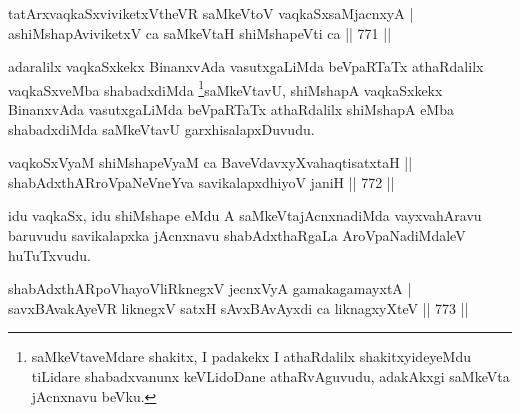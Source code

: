 
\begin{shl}
tatArxvaqkaSxviviketxV\s theVR saMkeVtoV vaqkaSxsaMjacnxyA | \\
ashiMshapAviviketxV ca saMkeVtaH shiMshapeVti ca \hfill||  771 ||  
\end{shl}

\begin{artha}
adaralilx vaqkaSxkekx BinanxvAda vasutxgaLiMda beVpaRTaTx athaRdalilx vaqkaSxveMba shabadxdiMda \footnote{saMkeVtaveMdare shakitx, I padakekx I athaRdalilx shakitxyideyeMdu tiLidare shabadxvanunx keVLidoDane athaRvAguvudu, adakAkxgi saMkeVta jAcnxnavu beVku.}saMkeVtavU, shiMshapA vaqkaSxkekx BinanxvAda vasutxgaLiMda beVpaRTaTx athaRdalilx shiMshapA eMba shabadxdiMda saMkeVtavU garxhisalapxDuvudu.
\end{artha}


\begin{shl}
vaqkoSxV\s yaM shiMshapeVyaM ca BaveVdavxyXvahaqtisatxtaH ||  \\
\footnotemark[2]shabAdxthARroVpaNeVneYva savikalapxdhiyoV janiH \hfill||  772 ||  
\end{shl}

\begin{artha}
idu vaqkaSx, idu shiMshape eMdu A saMkeVtajAcnxnadiMda vayxvahAravu baruvudu savikalapxka jAcnxnavu shabAdxthaRgaLa AroVpaNadiMdaleV huTuTxvudu.
\end{artha}

\begin{shl}
shabAdxthARpoVhayoVliRknegxV jecnxVyA gamakagamayxtA | \\
savxBAvakAyeVR liknegxV satxH sAvxBAvAyxdi ca liknagxyXteV \hfill||  773 ||  
\end{shl}

